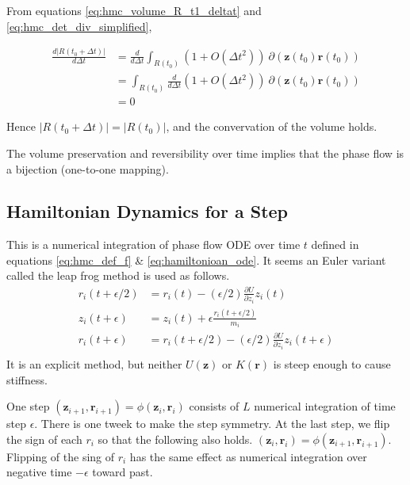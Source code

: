 \documentclass[a4]{article}
\begin{document}
From equations \ref{eq:hmc_volume_R_t1_deltat} 
and \ref{eq:hmc_det_div_simplified},

\begin{equation}
\begin{aligned}
\frac{d|R(t_0 + {\Delta}t)|}
     {d{\Delta}t}
&= 
\frac{d}{d{\Delta}t}
\int_{R(t_0)}
    \left(1 + O({\Delta}t^2)\right)\:
\partial(\bm{z}(t_0)\bm{r}(t_0))\\
&= 
\int_{R(t_0)}
\frac{d}{d{\Delta}t}
    \left(1 + O({\Delta}t^2)\right)\:
\partial(\bm{z}(t_0)\bm{r}(t_0))\\
&= 0
\end{aligned}
\end{equation}

Hence $|R(t_0 + {\Delta}t)| = |R(t_0)|$,
and the convervation of the volume holds.

The volume preservation and reversibility over time implies that 
the phase flow is a bijection (one-to-one mapping).

\subsection{Hamiltonian Dynamics for a Step}
This is a numerical integration of phase flow ODE over time $t$ defined
in equations \ref{eq:hmc_def_f} \& \ref{eq:hamiltonioan_ode}.
It seems an Euler variant called the leap frog method is used as follows.
\begin{equation}
\begin{aligned}
r_i(t + \epsilon/2) 
&= r_i(t) - (\epsilon/2)\frac{\partial U}{\partial z_i}z_i(t)\\
z_i(t+\epsilon) &= z_i(t) + \epsilon\frac{r_i(t+\epsilon/2)}{m_i}\\
r_i(t + \epsilon)
&= r_i(t + \epsilon/2) - 
   (\epsilon/2)\frac{\partial U}{\partial z_i}z_i(t+\epsilon)\\
\end{aligned}
\end{equation}
It is an explicit method, 
but neither  $U(\bm{z})$ or $K(\bm{r})$ is steep enough to cause stiffness.

One step $(\bm{z}_{i+1}, \bm{r}_{i+1}) = \phi(\bm{z}_i, \bm{r}_i)$ consists of $L$ numerical integration of time step $\epsilon$.
There is one tweek to make the step symmetry. At the last step, we flip the
sign of each $r_i$ so that the following also holds.
$(\bm{z}_{i}, \bm{r}_{i}) = \phi(\bm{z}_{i+1}, \bm{r}_{i+1})$.
Flipping of the sing of  $r_i$ has the same effect as numerical integration
over negative time $-\epsilon$ toward past.
\end{document}
